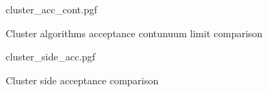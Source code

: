 \begin{figure}[!htb]
    \centering
    {cluster_acc_cont.pgf}
    \caption{Cluster algorithms acceptance contunuum limit comparison}
    \label{fig:cluster_acc_cont}
\end{figure}

\begin{figure}[!htb]
	\centering
    {cluster_side_acc.pgf}
    \caption{Cluster side acceptance comparison}
    \label{fig:cluster_side_acc}
\end{figure}

